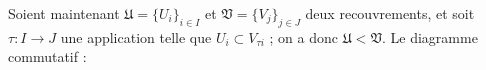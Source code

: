 Soient maintenant $\mathfrak{U} = \{U_i\}_{i \in I}$ et $\mathfrak{V} = \{V_j\}_{j \in J}$ deux recouvrements, et soit $\tau : I \to J$ une application telle que $U_i \subset V_{\tau i}$ ; on a donc $\mathfrak{U} < \mathfrak{V}$. Le diagramme commutatif :

\begin{center}
\end{center}

